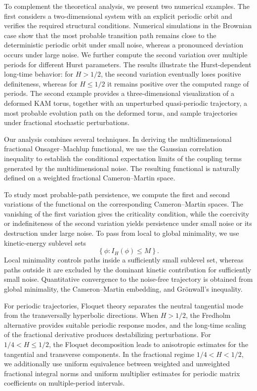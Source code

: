 \documentclass[preprint,12pt]{elsarticle}
\theoremstyle{definition}
\theoremstyle{plain}
\begin{document}
To complement the theoretical analysis, we present two numerical
examples. The first considers a two-dimensional system with an explicit
periodic orbit and verifies the required structural conditions.
Numerical simulations in the Brownian case show that the most probable
transition path remains close to the deterministic periodic orbit under
small noise, whereas a pronounced deviation occurs under large noise.
We further compute the second variation over multiple periods for
different Hurst parameters. The results illustrate the
Hurst-dependent long-time behavior: for $H>1/2$, the second variation
eventually loses positive definiteness, whereas for $H\leq1/2$ it
remains positive over the computed range of periods. The second example
provides a three-dimensional visualization of a deformed KAM torus,
together with an unperturbed quasi-periodic trajectory, a most probable
evolution path on the deformed torus, and sample trajectories under
fractional stochastic perturbations.


Our analysis combines several techniques. In deriving the multidimensional
fractional Onsager--Machlup functional, we use the Gaussian correlation
inequality to establish the conditional expectation limits of the coupling
terms generated by the multidimensional noise. The resulting functional is
naturally defined on a weighted fractional Cameron--Martin space.

To study most probable-path persistence, we compute the first and second
variations of the functional on the corresponding Cameron--Martin spaces.
The vanishing of the first variation gives the criticality condition, while
the coercivity or indefiniteness of the second variation yields persistence
under small noise or its destruction under large noise. To pass from local
to global minimality, we use kinetic-energy sublevel sets
\begin{equation*}
    \left\{
        \phi:I_H(\phi)\leq M
    \right\}.
\end{equation*}
Local minimality controls paths inside a sufficiently small sublevel set,
whereas paths outside it are excluded by the dominant kinetic contribution
for sufficiently small noise. Quantitative convergence to the noise-free
trajectory is obtained from global minimality, the Cameron--Martin embedding,
and Gr\"onwall's inequality.

For periodic trajectories, Floquet theory separates the neutral tangential
mode from the transversally hyperbolic directions. When $H>1/2$, the Fredholm
alternative provides suitable periodic response modes, and the long-time
scaling of the fractional derivative produces destabilizing perturbations.
For $1/4<H\leq1/2$, the Floquet decomposition leads to anisotropic estimates
for the tangential and transverse components. In the fractional regime
$1/4<H<1/2$, we additionally use uniform equivalence between weighted and
unweighted fractional integral norms and uniform multiplier estimates for
periodic matrix coefficients on multiple-period intervals.
\end{document}

